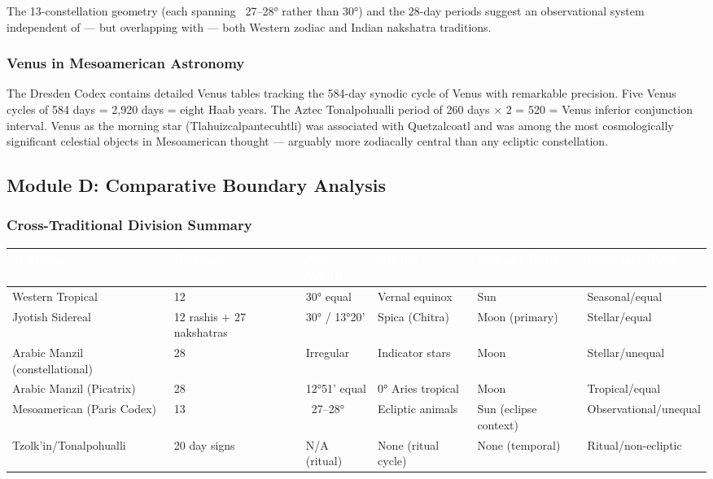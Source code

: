 \documentclass[11pt,letterpaper]{article}
\newcommand{\tableheader}[1]{\textbf{\sffamily\textcolor{white}{#1}}}
\begin{document}
The 13-constellation geometry (each spanning ~27--28° rather than 30°) and the 28-day periods suggest an observational system independent of --- but overlapping with --- both Western zodiac and Indian nakshatra traditions.

\subsubsection{Venus in Mesoamerican Astronomy}

The Dresden Codex contains detailed Venus tables tracking the 584-day synodic cycle of Venus with remarkable precision. Five Venus cycles of 584 days = 2,920 days = eight Haab years. The Aztec Tonalpohualli period of 260 days × 2 = 520 = Venus inferior conjunction interval. Venus as the morning star (Tlahuizcalpantecuhtli) was associated with Quetzalcoatl and was among the most cosmologically significant celestial objects in Mesoamerican thought --- arguably more zodiacally central than any ecliptic constellation.

\subsection{Module D: Comparative Boundary Analysis}

\subsubsection{Cross-Traditional Division Summary}

\begin{center}
\begin{tabularx}{\textwidth}{L{2.5cm}C{1.5cm}C{1.8cm}L{2cm}L{2cm}X}
\toprule
{}
\tableheader{Tradition} & \tableheader{Divisions} & \tableheader{Arc Width} & \tableheader{Anchor} & \tableheader{Primary Body} & \tableheader{Boundary Type} \\
\midrule
Western Tropical & 12 & 30° equal & Vernal equinox & Sun & Seasonal/equal \\
Jyotish Sidereal & 12 rashis + 27 nakshatras & 30° / 13°20' & Spica (Chitra) & Moon (primary) & Stellar/equal \\
Arabic Manzil (constellational) & 28 & Irregular & Indicator stars & Moon & Stellar/unequal \\
Arabic Manzil (Picatrix) & 28 & 12°51' equal & 0° Aries tropical & Moon & Tropical/equal \\
Mesoamerican (Paris Codex) & 13 & ~27--28° & Ecliptic animals & Sun (eclipse context) & Observational/unequal \\
Tzolk'in/Tonalpohualli & 20 day signs & N/A (ritual) & None (ritual cycle) & None (temporal) & Ritual/non-ecliptic \\
\bottomrule
\end{tabularx}
\end{center}
\end{document}
